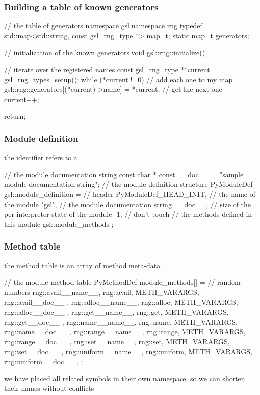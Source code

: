 \begin{frame}[fragile]
%
  \frametitle{Building a table of known generators}
%
  \begin{iC++}
// the table of generators
namespace gsl {
    namespace rng {
        typedef std::map<std::string, const gsl_rng_type *> map_t;
        static map_t generators;
    }
}

// initialization of the known generators
void 
gsl::rng::initialize()
{
    // iterate over the registered names
    const gsl_rng_type **current = gsl_rng_types_setup();
    while (*current !=0) {
        // add each one to my map
        gsl::rng::generators[(*current)->name] = *current;
        // get the next one
        current++;
    }

    return;
}
  \end{iC++}
%
\end{frame}

\begin{frame}[fragile]
%
  \frametitle{Module definition}
%
  the identifier  refers to a 
  \begin{iC++}{}
// the module documentation string
const char * const __doc__ = "sample module documentation string";
// the module definition structure
PyModuleDef gsl::module_definition = {
    // header
    PyModuleDef_HEAD_INIT,
    // the name of the module
    "gsl",
    // the module documentation string
    __doc__,
    // size of the per-interpreter state of the module
    -1, // don't touch
    // the methods defined in this module
    gsl::module_methods
};
  \end{iC++}
%
\end{frame}

\begin{frame}[fragile]
%
  \frametitle{Method table}
%
  the method table is an array of method meta-data
%
  \begin{iC++}{}
// the module method table
PyMethodDef module_methods[] = {
    // random numbers
    { rng::avail__name__, rng::avail, METH_VARARGS, rng::avail__doc__ },
    { rng::alloc__name__, rng::alloc, METH_VARARGS, rng::alloc__doc__ },
    { rng::get__name__, rng::get, METH_VARARGS, rng::get__doc__ },
    { rng::name__name__, rng::name, METH_VARARGS, rng::name__doc__ },
    { rng::range__name__, rng::range, METH_VARARGS, rng::range__doc__ },
    { rng::set__name__, rng::set, METH_VARARGS, rng::set__doc__ },
    { rng::uniform__name__, rng::uniform, METH_VARARGS, rng::uniform__doc__ },
};
  \end{iC++}
%
  we have placed all  related symbols in their own namespace, so we can shorten
  their names without conflicts
%
\end{frame}

